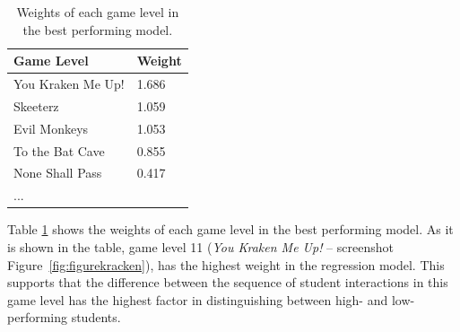 \documentclass{sigchi}
\begin{document}
	\begin{table}[b]
		\centering
		\begin{tabular}{ll}
			\hline
			\textbf{Game Level} & \textbf{Weight} \\ \hline
			You Kraken Me Up!   & 1.686                               \\
			Skeeterz            & 1.059                               \\
			Evil Monkeys        & 1.053                               \\
			To the Bat Cave     & 0.855                               \\
			None Shall Pass     & 0.417                               \\
			...                 &                                    
		\end{tabular}
		\caption{Weights of each game level in the best performing model.}
		\label{tab:regrweights}	
	\end{table}
		
		 
	Table \ref{tab:regrweights} shows the weights of each game level in the best performing model.
	As it is shown in the table, game level 11 (\textit{You Kraken Me Up!} -- screenshot Figure~\ref{fig:figurekracken}), has the highest weight in the regression model. 
	This supports that the difference between the sequence of student interactions in this game level has the highest factor in distinguishing between high- and low-performing students.
	
\end{document}
